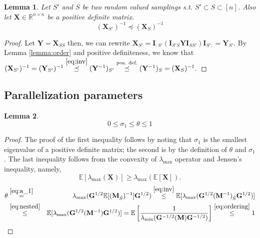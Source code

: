 \documentclass[11pt]{article}
\newcommand{\mojmir}[2]{\todo[inline]{{\textbf{Mojmir:} \emph{#1}}}}
\newtheorem{lemma}{Lemma}
\newcommand{\bI}{\mathbf{I}}
\newcommand{\bX}{\mathbf{X}}
\begin{document}
		\begin{lemma}
			Let $S'$ and $S$ be two random valued samplings s.t. $S' \subset S \subset [n] $. Also let $\mathbf{X} \in \mathbb{R}^{n \times n}$ be a positive definite matrix.
			\begin{equation}\label{eq:nested}
			(\mathbf{X}_{S'})^{-1} \preceq (\mathbf{X}_{S})^{-1}
			\end{equation}
		\end{lemma}
		\begin{proof}
 			Let $ \mathbf{Y} = \mathbf{X}_{SS}$ then, we can rewrite $\mathbf{X}_{S'} = \bI_{:S'}(\mathbf{I}_{S'S}\mathbf{Y}\mathbf{I}_{SS'})\bI_{S':} = \mathbf{Y}_{S'}$. By Lemma \ref{lemma:order} and positive definiteness, we know that $ (\mathbf{X}_{S'})^{-1}= (\mathbf{Y}_{S'})^{-1} \stackrel{\eqref{eq:inv}} \preceq (\mathbf{Y}^{-1})_{S'} \stackrel{\text{pos. def.}}\preceq (\mathbf{Y}^{-1})_{S} = (\mathbf{X}_{S})^{-1}. $
		\end{proof}
%		
	\subsection{Parallelization parameters}
	
	
	\begin{lemma}
		\begin{equation}\label{eq:firstorder}
			0 \leq \sigma_1 \leq \theta \leq 1
		\end{equation}
	\end{lemma}
	\begin{proof}
		The proof of the first inequality follows by noting that $\sigma_1$ is the smallest eigenvalue of a positive definite matrix; the second is by the definition of $ \theta$ and $\sigma_1$. The last inequality follows from the convexity of $\lambda_{\max}$ operator and Jensen's inequality, namely,
		\begin{equation}\label{eq:jensen}
			\mathbb{E}[\lambda_{\max}(\mathbf{X})]\geq \lambda_{\max}(\mathbb{E}[\mathbf{X}]).
		\end{equation}
		\begin{eqnarray}
			\theta & \stackrel{\eqref{eq:a_1}}  = & \lambda_{\max}(\mathbf{G}^{1/2}\mathbb{E}[(\mathbf{M}_{\hat{S}})^{-1}]\mathbf{G}^{1/2}) \stackrel{\eqref{eq:inv}}
			\leq  \mathbb{E}[\lambda_{\max}(\mathbf{G}^{1/2} (\mathbf{M}^{-1})_{\hat{S}} \mathbf{G}^{1/2})] \\
			& \stackrel{\eqref{eq:nested}}\leq & \mathbb{E}[\lambda_{\max}(\mathbf{G}^{1/2} (\mathbf{M}^{-1})\mathbf{G}^{1/2})] =  \mathbb{E}\left[\frac{1}{\lambda_{\min}(\mathbf{G}^{-1/2} (\mathbf{M}) \mathbf{G}^{-1/2})} \right] \stackrel{\eqref{eq:ordering}} \leq 1 \notag
		\end{eqnarray}
	\end{proof}
	
\end{document}
